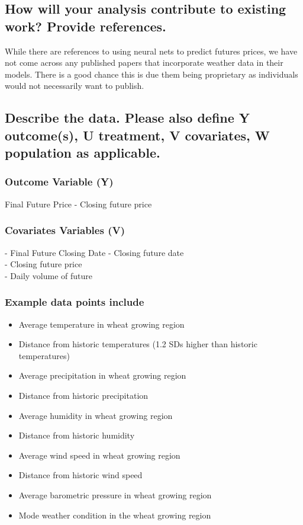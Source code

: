 \documentclass[twoside,11pt]{article}
\begin{document}
\subsection{How will your analysis contribute to existing work? Provide references.}

While there are references to using neural nets to predict futures prices, we have not come across any published papers that incorporate weather data in their models.  There is a good chance this is due them being proprietary as individuals would not necessarily want to publish.  


\subsection{Describe the data. Please also define Y outcome(s), U treatment, V covariates, W population as applicable.}

\subsubsection{Outcome Variable (Y)}
Final Future Price - Closing future price

\subsubsection{Covariates Variables (V)}

- Final Future Closing Date - Closing future date\\  
- Closing future price\\
- Daily volume of future

\subsubsection{Example data points include}
\begin{itemize}
  \item Average temperature in wheat growing region 
  \item Distance from historic temperatures (1.2 SDs higher than historic temperatures)
  \item Average precipitation in wheat growing region
  \item Distance from historic precipitation
  \item Average humidity in wheat growing region
  \item Distance from historic humidity
  \item Average wind speed in wheat growing region
  \item Distance from historic wind speed
  \item Average barometric pressure in wheat growing region
  \item Mode weather condition in the wheat growing region
\end{itemize}
\end{document}
